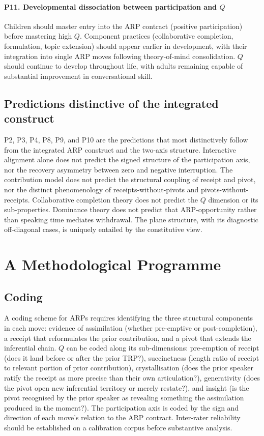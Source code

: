 \paragraph{P11. Developmental dissociation between participation and $Q$} Children should master entry into the ARP contract (positive participation) before mastering high $Q$. Component practices (collaborative completion, formulation, topic extension) should appear earlier in development, with their integration into single ARP moves following theory-of-mind consolidation. $Q$ should continue to develop throughout life, with adults remaining capable of substantial improvement in conversational skill.

\subsection{Predictions distinctive of the integrated construct}

P2, P3, P4, P8, P9, and P10 are the predictions that most distinctively follow from the integrated ARP construct and the two-axis structure. Interactive alignment alone does not predict the signed structure of the participation axis, nor the recovery asymmetry between zero and negative interruption. The contribution model does not predict the structural coupling of receipt and pivot, nor the distinct phenomenology of receipts-without-pivots and pivots-without-receipts. Collaborative completion theory does not predict the $Q$ dimension or its sub-properties. Dominance theory does not predict that ARP-opportunity rather than speaking time mediates withdrawal. The plane structure, with its diagnostic off-diagonal cases, is uniquely entailed by the constitutive view.

\section{A Methodological Programme}\label{sec:methods}

\subsection{Coding}

A coding scheme for ARPs requires identifying the three structural components in each move: evidence of assimilation (whether pre-emptive or post-completion), a receipt that reformulates the prior contribution, and a pivot that extends the inferential chain. $Q$ can be coded along its sub-dimensions: pre-emption of receipt (does it land before or after the prior TRP?), succinctness (length ratio of receipt to relevant portion of prior contribution), crystallisation (does the prior speaker ratify the receipt as more precise than their own articulation?), generativity (does the pivot open new inferential territory or merely restate?), and insight (is the pivot recognised by the prior speaker as revealing something the assimilation produced in the moment?). The participation axis is coded by the sign and direction of each move's relation to the ARP contract. Inter-rater reliability should be established on a calibration corpus before substantive analysis.

